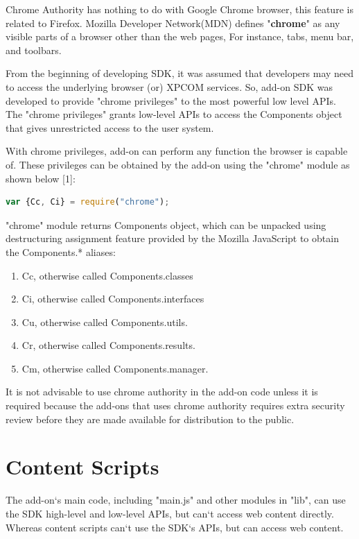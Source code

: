 Chrome Authority has nothing to do with Google Chrome browser, this feature is related to Firefox. Mozilla Developer Network(MDN) defines "\textbf{chrome}" as any visible parts of a browser other than the web pages, For instance, tabs, menu bar, and toolbars.

From the beginning of developing SDK, it was assumed that developers may need to access the underlying browser (or) XPCOM services. So, add-on SDK was developed to provide "chrome privileges" to the most powerful low level APIs. The "chrome privileges" grants low-level APIs to access the Components object that gives unrestricted access to the user system.  

With chrome privileges, add-on can perform any function the browser is capable of. These privileges can be obtained by the add-on using the "chrome" module as shown below [1]:
\begin{lstlisting}[frame=single,language=JavaScript,numbers=none,mathescape=false]
var {Cc, Ci} = require("chrome");
\end{lstlisting}
"chrome" module returns Components object, which can be unpacked using destructuring assignment feature provided by the Mozilla JavaScript to obtain the Components.* aliases: 
\begin{enumerate}
\item Cc, otherwise called Components.classes
\item Ci, otherwise called Components.interfaces
\item Cu, otherwise called Components.utils.
\item Cr, otherwise called Components.results.
\item Cm, otherwise called Components.manager.
\end{enumerate}
It is not advisable to use chrome authority in the add-on code unless it is required because the add-ons that uses chrome authority requires extra security review before they are made available for distribution to the public.

\section{Content Scripts} \label{sec:contentscript}

The add-on`s main code, including "main.js" and other modules in "lib", can use the SDK high-level and low-level APIs, but can`t access web content directly. Whereas content scripts can`t use the SDK`s APIs, but can access web content.

